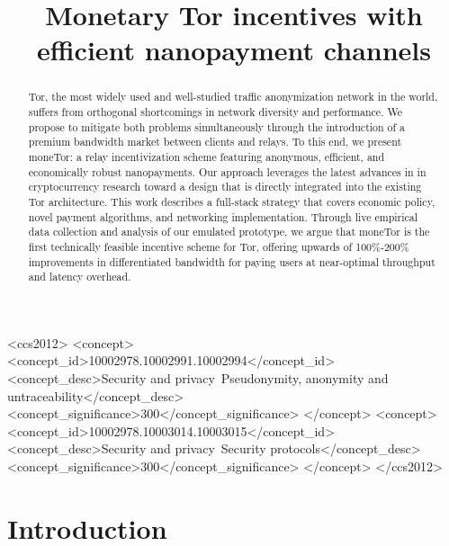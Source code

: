 \documentclass[sigconf, anonymous]{acmart}
\begin{document}
\title{Monetary Tor incentives with efficient nanopayment channels} %

\begin{abstract}

  Tor, the most widely used and well-studied traffic anonymization network in
  the world, suffers from orthogonal shortcomings in network diversity and
  performance. We propose to mitigate both problems simultaneously through the
  introduction of a premium bandwidth market between clients and relays. To this
  end, we present moneTor: a relay incentivization scheme featuring anonymous,
  efficient, and economically robust nanopayments. Our approach leverages the
  latest advances in in cryptocurrency research toward a design that is directly
  integrated into the existing Tor architecture. This work describes a
  full-stack strategy that covers economic policy, novel payment algorithms, and
  networking implementation. Through live empirical data collection and analysis
  of our emulated prototype, we argue that moneTor is the first technically
  feasible incentive scheme for Tor, offering upwards of 100\%-200\%
  improvements in differentiated bandwidth for paying users at near-optimal
  throughput and latency overhead.

\end{abstract}

\begin{CCSXML}
<ccs2012>
<concept>
<concept_id>10002978.10002991.10002994</concept_id>
<concept_desc>Security and privacy~Pseudonymity, anonymity and untraceability</concept_desc>
<concept_significance>300</concept_significance>
</concept>
<concept>
<concept_id>10002978.10003014.10003015</concept_id>
<concept_desc>Security and privacy~Security protocols</concept_desc>
<concept_significance>300</concept_significance>
</concept>
</ccs2012>
\end{CCSXML}



\maketitle

\section{Introduction}
\label{sec:introduction}

\end{document}

